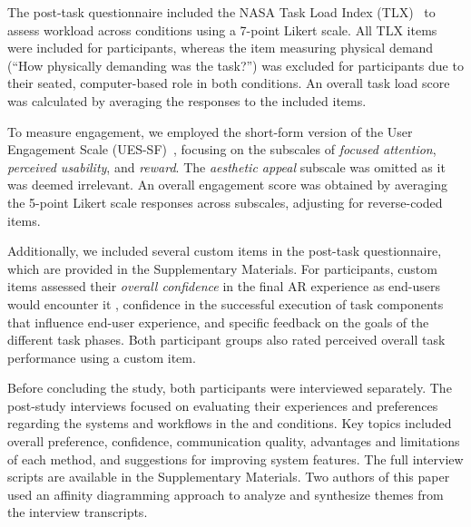 The post-task questionnaire included the NASA Task Load Index (TLX)~\cite{hartDevelopmentNASATLXTask1988} to assess workload across conditions using a 7-point Likert scale. All TLX items were included for \insitu participants, whereas the item measuring physical demand (``How physically demanding was the task?'') was excluded for \exsitu participants due to their seated, computer-based role in both conditions. An overall task load score was calculated by averaging the responses to the included items.

To measure engagement, we employed the short-form version of the User Engagement Scale (UES-SF)~\cite{obrienPracticalApproachMeasuring2018}, focusing on the subscales of \textit{focused attention}, \textit{perceived usability}, and \textit{reward}. The \textit{aesthetic appeal} subscale was omitted as it was deemed irrelevant. An overall engagement score was obtained by averaging the 5-point Likert scale responses across subscales, adjusting for reverse-coded items.

Additionally, we included several custom items in the post-task questionnaire, which are provided in the Supplementary Materials. For \exsitu participants, custom items assessed their \textit{overall confidence} in the final AR experience as end-users would encounter it \insitu[ ], confidence in the successful execution of task components that influence end-user experience, and specific feedback on the goals of the different task phases. Both participant groups also rated perceived overall task performance using a custom item.

Before concluding the study, both participants were interviewed separately. The post-study interviews focused on evaluating their experiences and preferences regarding the systems and workflows in the \sync and \async conditions. Key topics included overall preference, confidence, communication quality, advantages and limitations of each method, and suggestions for improving system features. The full interview scripts are available in the Supplementary Materials. Two authors of this paper used an affinity diagramming approach to analyze and synthesize themes from the interview transcripts.
